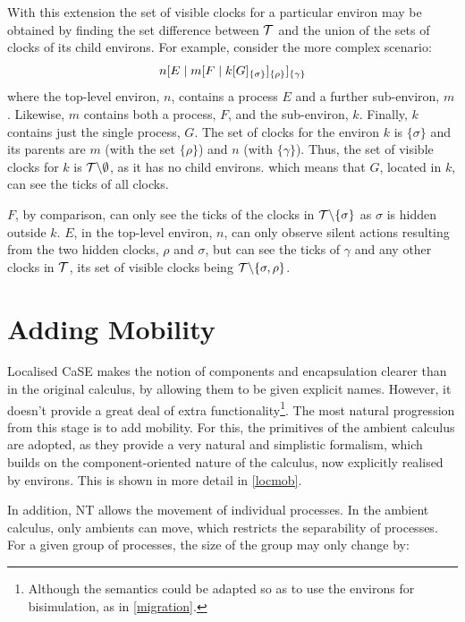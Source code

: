 With this extension the set of visible clocks for a particular environ
may be obtained by finding the set difference between $\text{$\mathcal{T}$}$ and
the union of the sets of clocks of its child environs.  For example,
consider the more complex scenario:
\begin{equation}
{n}[ E\;|\;{m}[ F\;|\;{k}[ G ]_{\{\sigma\}} ]_{\{\rho\}} ]_{\{\gamma\}}
\end{equation}
where the top-level environ, $n$, contains a process $E$ and a further
sub-environ, $m$.  Likewise, $m$ contains both a process, $F$, and the
sub-environ, $k$.  Finally, $k$ contains just the single process, $G$.
The set of clocks for the environ $k$ is $\{\sigma\}$ and its parents
are $m$ (with the set $\{\rho\}$) and $n$ (with $\{\gamma\}$).  Thus,
the set of visible clocks for $k$ is $\text{$\mathcal{T}$} \backslash \emptyset$,
as it has no child environs.  which means that $G$, located in $k$,
can see the ticks of all clocks.

$F$, by comparison, can only see the ticks of the clocks in $\text{$\mathcal{T}$}
\backslash \{\sigma\}$ as $\sigma$ is hidden outside $k$.  $E$, in the
top-level environ, $n$, can only observe silent actions resulting from
the two hidden clocks, $\rho$ and $\sigma$, but can see the ticks of
$\gamma$ and any other clocks in $\text{$\mathcal{T}$}$, its set of visible clocks
being $\text{$\mathcal{T}$} \backslash \{\sigma, \rho\}$.

\section{Adding Mobility}
\label{addingmob}

Localised CaSE makes the notion of components and encapsulation clearer
than in the original calculus, by allowing them to be given explicit
names.  However, it doesn't provide a great deal of extra
functionality\footnote{Although the semantics could be adapted so as to
use the environs for bisimulation, as in \ref{migration}.}.  The most
natural progression from this stage is to add mobility.  For this, the
primitives of the ambient calculus are adopted, as they provide a very
natural and simplistic formalism, which builds on the component-oriented
nature of the calculus, now explicitly realised by environs.  This is
shown in more detail in \ref{locmob}.

In addition, NT allows the movement of individual processes.  In the
ambient calculus, only ambients can move, which restricts the
separability of processes.  For a given group of processes, the
size of the group may only change by:

